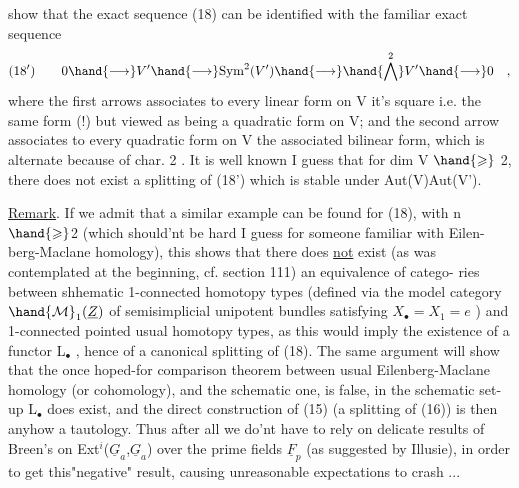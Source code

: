 
show that the exact sequence (18) can be identified with the familiar
exact sequence
\[ (18') \qquad 0 \hand{\longrightarrow} V' \hand{\longrightarrow} \mathrm{Sym}^2(V') \hand{\longrightarrow} \hand{\bigwedge^{2}} V' \hand{\longrightarrow} 0 \quad , \]
where the first arrows associates to every linear form on V it's square
i.e. the same form (!) but viewed as being a quadratic form on V; and
the second arrow associates to every quadratic form on V the associated
bilinear form, which is alternate because of char. 2 . It is well
known I guess that for dim V $\hand{\geqslant}$ 2, there does not exist a splitting of
(18') which is stable under Aut(V)\hand{$\simeq$}Aut(V').

\uline{Remark}. If we admit that a similar example can be found for  (18), with
n $\hand{\geqslant}$2 (which should'nt be hard I guess for someone familiar with Eilen-%
berg-Maclane homology), this shows that there does \uline{not} exist (as was
contemplated at the beginning, cf. section 111) an equivalence of catego-%
ries between shhematic 1-connected homotopy types (defined via the
model category $\hand{\mathcal{M}}_1(\underline{Z})$ of semisimplicial unipotent bundles  satisfying
$X_{\bullet}$$=X_1=e$ ) and 1-connected pointed usual homotopy types, as this would
imply the existence of a functor L\hand{$\Pi$}$_{\bullet}$ , \xout{\unsure{(**)}} hence of a canonical splitting
of (18). The same argument will show that the once hoped-for comparison
theorem between usual Eilenberg-Maclane homology (or cohomology), and
the schematic one, is false,   in the schematic set-up L\hand{$\Pi$}$_{\bullet}$ does
exist, and the direct construction of (15) (a  splitting of (16)) is
then anyhow a tautology. Thus after all we do'nt have to rely on
delicate results of Breen's on  Ext$^{i}$($\underline{G}_a$,$\underline{G}_a$) over the
prime fields $\underline{F}_p$  (as suggested by Illusie), in order
to get this"negative" result, causing unreasonable expectations to
crash ...



